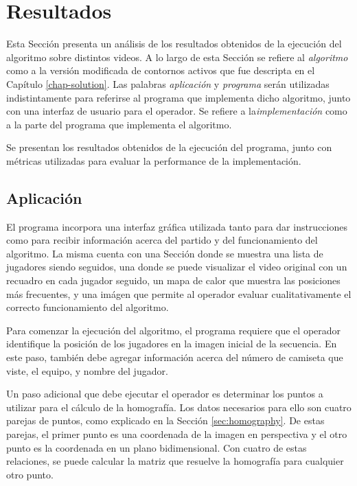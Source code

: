 \chapter{Resultados}
\label{chap-results}

Esta Sección presenta un análisis de los resultados obtenidos de la ejecución
del algoritmo sobre distintos videos. A lo largo de esta Sección se refiere al
\textit{algoritmo} como a la versión modificada de contornos activos que fue
descripta en el Capítulo \ref{chap-solution}. Las palabras \textit{aplicación}
y \textit{programa} serán utilizadas indistintamente para referirse al programa
que implementa dicho algoritmo, junto con una interfaz de usuario para el
operador. Se refiere a la\textit{implementación} como a la parte del programa
que implementa el algoritmo.

Se presentan los resultados obtenidos de la ejecución del programa, junto con
métricas utilizadas para evaluar la performance de la implementación.

\section{Aplicación}

El programa incorpora una interfaz gráfica utilizada tanto para dar
instrucciones como para recibir información acerca del partido y del
funcionamiento del algoritmo. La misma cuenta con una Sección donde se muestra
una lista de jugadores siendo seguidos, una donde se puede visualizar el video
original con un recuadro en cada jugador seguido, un mapa de calor que muestra
las posiciones más frecuentes, y una imágen que permite al operador evaluar
cualitativamente el correcto funcionamiento del algoritmo.

Para comenzar la ejecución del algoritmo, el programa requiere que el operador
identifique la posición de los jugadores en la imagen inicial de la secuencia.
En este paso, también debe agregar información acerca del número de camiseta
que viste, el equipo, y nombre del jugador.

Un paso adicional que debe ejecutar el operador es determinar los puntos a
utilizar para el cálculo de la homografía. Los datos necesarios para ello son
cuatro parejas de puntos, como explicado en la Sección \ref{sec:homography}. De
estas parejas, el primer punto es una coordenada de la imagen en perspectiva y
el otro punto es la coordenada en un plano bidimensional. Con cuatro de estas
relaciones, se puede calcular la matriz que resuelve la homografía para
cualquier otro punto.

